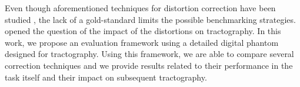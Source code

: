 Even though aforementioned techniques for distortion correction
have been studied \cite{zeng_image_2002,wu_comparison_2008},
the lack of a gold-standard limits the possible benchmarking 
strategies. \cite{irfanoglu_effects_2012} opened the question
of the impact of the distortions on tractography. In this work,
we propose an evaluation framework using a detailed digital 
phantom designed for tractography. Using this framework,
we are able to compare several correction techniques and we
provide results related to their performance in the task
itself and their impact on subsequent tractography.